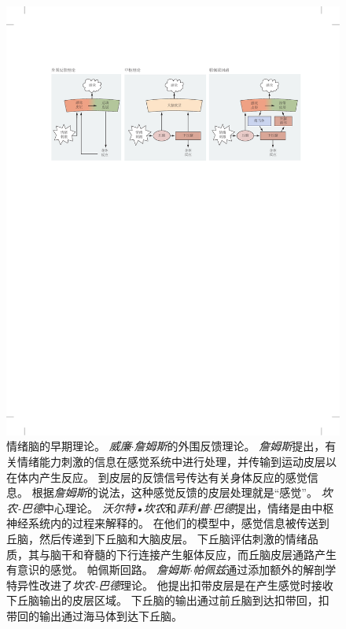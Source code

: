 \begin{figure}[htbp]
	\centering
	\includegraphics[width=1.0\linewidth]{chap42/fig_42_2}
	\caption{情绪脑的早期理论\cite{ledoux1997emotional}。
		\textit{威廉$\cdot$詹姆斯}的外围反馈理论。
		\textit{詹姆斯}提出，有关情绪能力刺激的信息在感觉系统中进行处理，并传输到运动皮层以在体内产生反应。
		到皮层的反馈信号传达有关身体反应的感觉信息。
		根据\textit{詹姆斯}的说法，这种感觉反馈的皮层处理就是“感觉”。
		\textit{坎农-巴德}中心理论。
		\textit{沃尔特•坎农}和\textit{菲利普$\cdot$巴德}提出，情绪是由中枢神经系统内的过程来解释的。
		在他们的模型中，感觉信息被传送到丘脑，然后传递到下丘脑和大脑皮层。
		下丘脑评估刺激的情绪品质，其与脑干和脊髓的下行连接产生躯体反应，而丘脑皮层通路产生有意识的感觉。
		帕佩斯回路。
		\textit{詹姆斯$\cdot$帕佩兹}通过添加额外的解剖学特异性改进了\textit{坎农-巴德}理论。
		他提出扣带皮层是在产生感觉时接收下丘脑输出的皮层区域。
		下丘脑的输出通过前丘脑到达扣带回，扣带回的输出通过海马体到达下丘脑。}
	\label{fig:42_2}
\end{figure}


